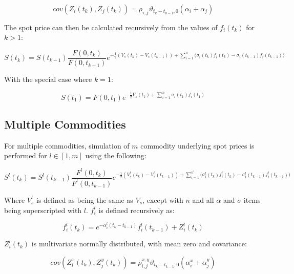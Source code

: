\documentclass{article}
\begin{document}
\begin{equation}
    cov(Z_i(t_k), Z_j(t_k)) = \rho_{i, j} \vartheta_{t_k-t_{k-1}, 0}(\alpha_i + \alpha_j)
\end{equation}

\bigskip

The spot price can then be calculated recursively from the values of $f_i(t_k)$ for $k>1$:

\begin{equation}
    \label{eq:appendix_spot_sim}
    S(t_k) = S(t_{k-1}) \frac{F(0, t_k)}{F(0, t_{k-1})} e^{- \frac{1}{2} (V_s(t_k) - 
    V_s(t_{k-1})) + \sum_{i=1}^n \bigl(\sigma_i(t_k)f_i(t_k) - \sigma_i(t_{k-1})f_i(t_{k-1})\bigr)}
\end{equation}

With the special case where $k=1$:

\begin{equation}
    S(t_1) = F(0, t_1) e^{- \frac{1}{2} V_s(t_1) + 
    \sum_{i=1}^n \sigma_i(t_1) f_i(t_1) }
\end{equation}

\subsection{Multiple Commodities}
For multiple commodities, simulation of $m$ commodity underlying spot prices is 
performed for $l \in [1, m]$ using the following:

\begin{equation}
    S^l(t_k) = S^l(t_{k-1}) \frac{F^l(0, t_k)}{F^l(0, t_{k-1})} e^{- \frac{1}{2} (V_s^l(t_k) - 
    V_s^l(t_{k-1})) + \sum_{i=1}^{n^l} \bigl(\sigma_i^l(t_k)f_i^l(t_k) - \sigma_i^l(t_{k-1})f_i^l(t_{k-1})\bigr)}
\end{equation}

Where $V_s^l$ is defined as being the same as $V_s$, except with $n$ and all $\alpha$ and 
$\sigma$ items being superscripted with $l$. $f_i^l$ is defined recursively as:

\begin{equation}
    f_i^l(t_k) = e^{-\alpha_i^l(t_k - t_{k-1})}f_i^l(t_{k-1}) + Z_i^l(t_k)
\end{equation}

$Z_i^l(t_k)$ is multivariate normally distributed, with mean zero and covariance:

\begin{equation}
    \label{eq:appendix_z_covar}
    cov(Z_i^x(t_k), Z_j^y(t_k)) = \rho_{i, j}^{x, y} \vartheta_{t_k-t_{k-1}, 0}(\alpha_i^x + \alpha_j^y)
\end{equation}
\end{document}
